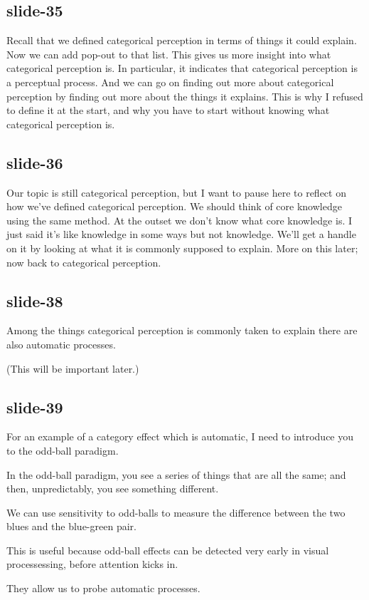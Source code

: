 \documentclass[12pt,\papersize]{extarticle}
\begin{document}
\subsection{slide-35}
Recall that we defined categorical perception in terms of things it could explain.
Now we can add pop-out to that list.
This gives us more insight into what categorical perception is.
In particular, it indicates that categorical perception is a perceptual process.
And we can go on finding out more about categorical perception by finding out more about the things it explains.
This is why I refused to define it at the start, and why you have to start without knowing what categorical perception is.

\subsection{slide-36}
Our topic is still categorical perception, but I want to pause here to reflect on how
we've defined categorical perception.
We should think of core knowledge using the same method.
At the outset we don't know what core knowledge is.
I just said it's like knowledge in some ways but not knowledge.
We'll get a handle on it by looking at what it is commonly supposed to explain.
More on this later; now back to categorical perception.

\subsection{slide-38}
Among the things categorical perception is commonly taken to explain there are also automatic processes.

(This will be important later.)

\subsection{slide-39}
For an example of a category effect which is automatic, I need to introduce you to the odd-ball paradigm.

In the odd-ball paradigm, you see a series of things that are all the same; and then, unpredictably, you see something different.

We can use sensitivity to odd-balls to measure the difference between the two blues and the blue-green pair.

This is useful because odd-ball effects can be detected very early in visual processessing, before attention kicks in.

They allow us to probe automatic processes.
\end{document}

